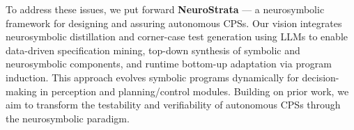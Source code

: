 To address these issues, we put forward \textbf{NeuroStrata} --- a neurosymbolic framework for designing and assuring autonomous CPSs. Our vision integrates neurosymbolic distillation and corner-case test generation using LLMs to enable data-driven specification mining, top-down synthesis of symbolic and neurosymbolic components, and runtime bottom-up adaptation via program induction. This approach evolves symbolic programs dynamically for decision-making in perception and planning/control modules. Building on prior work, we aim to transform the testability and verifiability of autonomous CPSs through the neurosymbolic paradigm.


